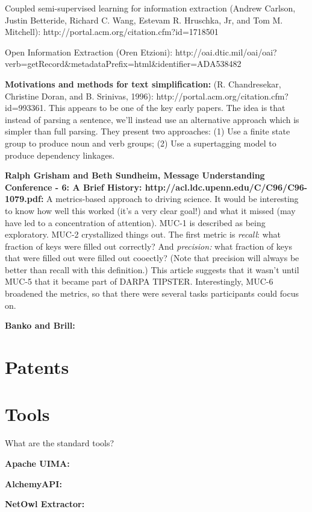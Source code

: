 Coupled semi-supervised learning for information extraction (Andrew
Carlson, Justin Betteride, Richard C. Wang, Estevam R. Hruschka, Jr,
and Tom M. Mitchell): http://portal.acm.org/citation.cfm?id=1718501

Open Information Extraction (Oren Etzioni):
http://oai.dtic.mil/oai/oai?verb=getRecord\&metadataPrefix=html\&identifier=ADA538482

\textbf{Motivations and methods for text simplification:}
(R. Chandresekar, Christine Doran, and B. Srinivas, 1996):
http://portal.acm.org/citation.cfm?id=993361.  This appears to be one
of the key early papers.  The idea is that instead of parsing a
sentence, we'll instead use an alternative approach which is simpler
than full parsing.  They present two approaches: (1) Use a finite
state group to produce noun and verb groups; (2) Use a supertagging
model to produce dependency linkages.

\textbf{Ralph Grisham and Beth Sundheim, Message Understanding
  Conference - 6: A Brief History:
  http://acl.ldc.upenn.edu/C/C96/C96-1079.pdf:} A metrics-based
approach to driving science.  It would be interesting to know how well
this worked (it's a very clear goal!) and what it missed (may have led
to a concentration of attention).  MUC-1 is described as being
exploratory.  MUC-2 crystallized things out.  The first metric is
\emph{recall}: what fraction of keys were filled out correctly?  And
\emph{precision:} what fraction of keys that were filled out were
filled out cooectly?  (Note that precision will always be better than
recall with this definition.)  This article suggests that it wasn't
until MUC-5 that it became part of DARPA TIPSTER.  Interestingly,
MUC-6 broadened the metrics, so that there were several tasks
participants could focus on.

\textbf{Banko and Brill:}

\section{Patents}


\section{Tools}

What are the standard tools?

\textbf{Apache UIMA:}

\textbf{AlchemyAPI:}

\textbf{NetOwl Extractor:}

